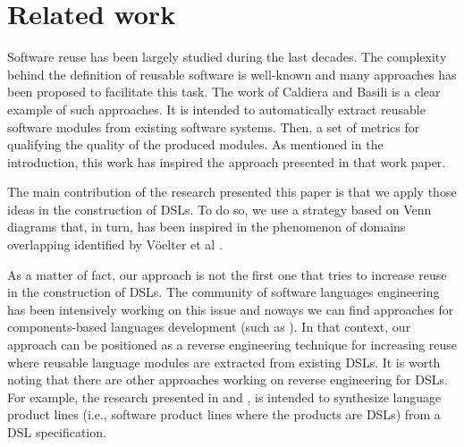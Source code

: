 \section{Related work}
\label{sec:relatedwork}

Software reuse has been largely studied during the last decades. The complexity behind the definition of reusable software is well-known and many approaches has been proposed to facilitate this task. The work of Caldiera and Basili \cite{Caldiera:1991} is a clear example of such approaches. It is intended to automatically extract reusable software modules from existing software systems. Then, a set of metrics for qualifying the quality of the produced modules. As mentioned in the introduction, this work has inspired the approach presented in that work paper. 

The main contribution of the research presented this paper is that we apply those ideas in the construction of DSLs. To do so, we use a strategy based on Venn diagrams that, in turn, has been inspired in the phenomenon of domains overlapping identified by V\"oelter et al \cite[p. 60-61]{voelter:2013}.

As a matter of fact, our approach is not the first one that tries to increase reuse in the construction of DSLs. The community of software languages engineering has been intensively working on this issue and noways we can find approaches for components-based languages development (such as \cite{Vacchi:2015,Mernik:2013,Rumpe:2010}). In that context, our approach can be positioned as a reverse engineering technique for increasing reuse where reusable language modules are extracted from existing DSLs. It is worth noting that there are other approaches working on reverse engineering for DSLs. For example, the research presented in \cite{vacchi:2014} and \cite{Kuhn:2015}, is intended to synthesize language product lines (i.e., software product lines where the products are DSLs) from a DSL specification. 

 

